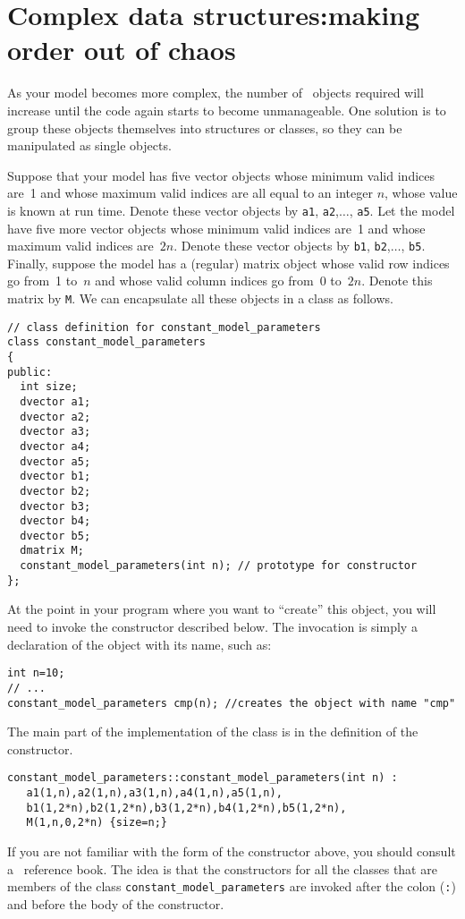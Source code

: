\documentclass{admbmanual}
\begin{document}
\section{Complex data structures:\br making order out of chaos}

As your model becomes more complex, the number of \scAD\
objects required will increase until the code again starts to become
unmanageable. One solution is to group these objects themselves
into structures or classes, so they can be manipulated as
single objects. 

Suppose that your model has five vector objects whose minimum valid
indices are~1 and whose maximum valid indices are all equal
to an integer $n$, whose value is known at run time. Denote
these vector objects by \texttt{a1}, \texttt{a2},$\ldots$, \texttt{a5}. Let the model
have five more vector objects whose minimum valid indices 
are~1 and whose maximum valid indices are~$2n$.  
Denote these vector objects by \texttt{b1}, \texttt{b2},$\ldots$, \texttt{b5}.
Finally, suppose the model has a (regular) matrix object whose valid
row indices go from~1 to~$n$ and whose valid column
indices go from~0 to~$2n$. Denote this matrix by \texttt{M}.
We can encapsulate all these objects in a class as follows.
\begin{lstlisting}
// class definition for constant_model_parameters
class constant_model_parameters
{
public:
  int size;
  dvector a1; 
  dvector a2; 
  dvector a3; 
  dvector a4; 
  dvector a5; 
  dvector b1; 
  dvector b2; 
  dvector b3; 
  dvector b4; 
  dvector b5; 
  dmatrix M;
  constant_model_parameters(int n); // prototype for constructor 
};
\end{lstlisting}

At the point in your program where you want to ``create'' this object,
you will need to invoke the constructor described below. The invocation
is simply a declaration of the object with its name, such as:
\begin{lstlisting}
int n=10;
// ...
constant_model_parameters cmp(n); //creates the object with name "cmp"
\end{lstlisting}

The main part of the implementation of the class is in the definition
of the constructor.  
\begin{lstlisting}
constant_model_parameters::constant_model_parameters(int n) :
   a1(1,n),a2(1,n),a3(1,n),a4(1,n),a5(1,n), 
   b1(1,2*n),b2(1,2*n),b3(1,2*n),b4(1,2*n),b5(1,2*n), 
   M(1,n,0,2*n) {size=n;}
\end{lstlisting}
If you are not familiar with the form of the constructor above,
you should consult a \cplus\ reference book. The idea is that the
constructors for all the classes that are members of
the class \texttt{constant\_model\_parameters}
are invoked after the colon (\texttt{:}) and before the body of the constructor.
\end{document}
